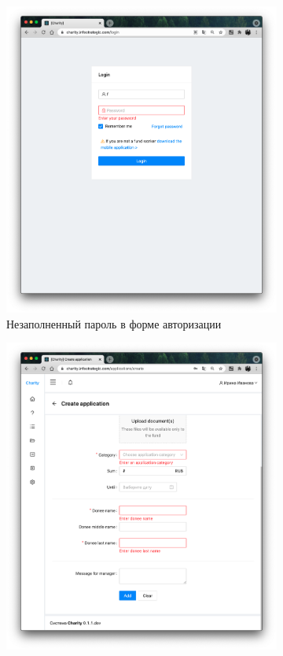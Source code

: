 \documentclass[a4paper,12pt,reqno]{article}
\begin{document}
	\begin{figure}[h!]
		\centering
		\begin{subfigure}[b]{0.35\linewidth}
			\includegraphics[width=\linewidth]{img/ro/login_error_password.png}
			\caption{\label{pic: invalid_login} Незаполненный пароль в форме авторизации}
		\end{subfigure}
		\begin{subfigure}[b]{0.35\linewidth}
			\includegraphics[width=\linewidth]{img/ro/create_application_form.png}

\end{subfigure}
\end{figure}
\end{document}

